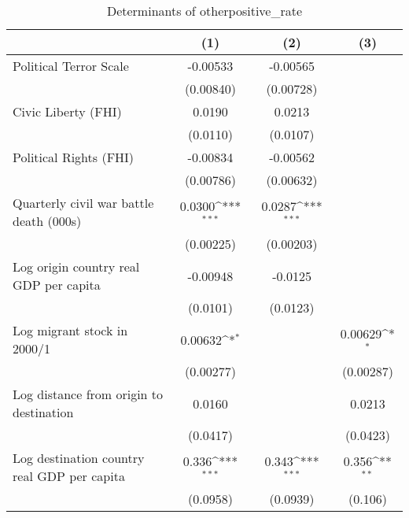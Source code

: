 \begin{table}[htbp]\centering
\def\sym#1{\ifmmode^{#1}\else\(^{#1}\)\fi}
\caption{Determinants of otherpositive\_rate}
\begin{tabular}{l*{3}{c}}
\hline\hline
                    &\multicolumn{1}{c}{(1)}         &\multicolumn{1}{c}{(2)}         &\multicolumn{1}{c}{(3)}         \\
\hline
Political Terror Scale&    -0.00533         &    -0.00565         &                     \\
                    &   (0.00840)         &   (0.00728)         &                     \\
[1em]
Civic Liberty (FHI) &      0.0190         &      0.0213         &                     \\
                    &    (0.0110)         &    (0.0107)         &                     \\
[1em]
Political Rights (FHI)&    -0.00834         &    -0.00562         &                     \\
                    &   (0.00786)         &   (0.00632)         &                     \\
[1em]
Quarterly civil war battle death (000s)&      0.0300\sym{***}&      0.0287\sym{***}&                     \\
                    &   (0.00225)         &   (0.00203)         &                     \\
[1em]
Log origin country real GDP per capita&    -0.00948         &     -0.0125         &                     \\
                    &    (0.0101)         &    (0.0123)         &                     \\
[1em]
Log migrant stock in 2000/1&     0.00632\sym{*}  &                     &     0.00629\sym{*}  \\
                    &   (0.00277)         &                     &   (0.00287)         \\
[1em]
Log distance from origin to destination&      0.0160         &                     &      0.0213         \\
                    &    (0.0417)         &                     &    (0.0423)         \\
[1em]
Log destination country real GDP per capita&       0.336\sym{***}&       0.343\sym{***}&       0.356\sym{**} \\
                    &    (0.0958)         &    (0.0939)         &     (0.106)         \\

\end{tabular}
\end{table}
